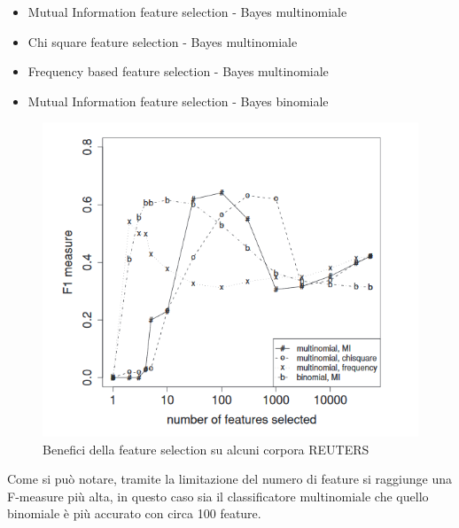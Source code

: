 \documentclass{article}
\theoremstyle{plain}
\theoremstyle{definition}
\begin{document}
\begin{itemize}  
\item Mutual Information feature selection - Bayes multinomiale
\item Chi square feature selection - Bayes multinomiale
\item Frequency based feature selection - Bayes multinomiale
\item Mutual Information feature selection - Bayes binomiale
\end{itemize}
\begin{figure}[htbp]
\begin{center}
\includegraphics[scale=0.80]{img/fselection.png}
\caption{Benefici della feature selection su alcuni corpora REUTERS}
\end{center}
\end{figure}
Come si può notare, tramite la limitazione del numero di feature si raggiunge una F-measure più alta, in questo caso sia il classificatore multinomiale che quello binomiale è più accurato con circa 100 feature.


\newpage
\end{document}

